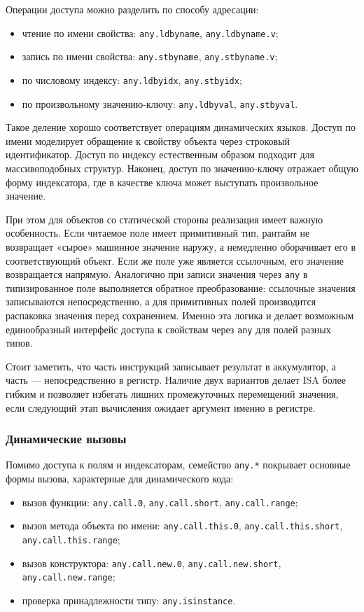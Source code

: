 Операции доступа можно разделить по способу адресации:
\begin{itemize}
    \item чтение по имени свойства: \texttt{any.ldbyname}, \texttt{any.ldbyname.v};
    \item запись по имени свойства: \texttt{any.stbyname}, \texttt{any.stbyname.v};
    \item по числовому индексу: \texttt{any.ldbyidx}, \texttt{any.stbyidx};
    \item по произвольному значению-ключу: \texttt{any.ldbyval}, \texttt{any.stbyval}.
\end{itemize}

Такое деление хорошо соответствует операциям динамических языков. Доступ по имени моделирует
обращение к свойству объекта через строковый идентификатор. Доступ по индексу естественным образом
подходит для массивоподобных структур. Наконец, доступ по значению-ключу отражает общую форму
индексатора, где в качестве ключа может выступать произвольное значение.

При этом для объектов со статической стороны реализация имеет важную особенность. Если читаемое поле
имеет примитивный тип, рантайм не возвращает «сырое» машинное значение наружу, а немедленно
оборачивает его в соответствующий объект. Если же поле уже является ссылочным, его значение
возвращается напрямую. Аналогично при записи значения через \texttt{any} в типизированное поле
выполняется обратное преобразование: ссылочные значения записываются непосредственно, а для
примитивных полей производится распаковка значения перед сохранением. Именно эта логика и делает
возможным единообразный интерфейс доступа к свойствам через \texttt{any} для полей разных типов.

Стоит заметить, что часть инструкций записывает результат в аккумулятор, а часть --- непосредственно
в регистр. Наличие двух вариантов делает ISA более гибким и позволяет избегать лишних промежуточных
перемещений значения, если следующий этап вычисления ожидает аргумент именно в регистре.

\subsubsection{Динамические вызовы}

Помимо доступа к полям и индексаторам, семейство \texttt{any.*} покрывает основные формы вызова,
характерные для динамического кода:
\begin{itemize}
    \item вызов функции: \texttt{any.call.0}, \texttt{any.call.short}, \texttt{any.call.range};
    \item вызов метода объекта по имени:
    \texttt{any.call.this.0}, \newline  \texttt{any.call.this.short}, \texttt{any.call.this.range};
    \item вызов конструктора:
    \texttt{any.call.new.0}, \texttt{any.call.new.short}, \newline \texttt{any.call.new.range};
    \item проверка принадлежности типу: \texttt{any.isinstance}.
\end{itemize}

